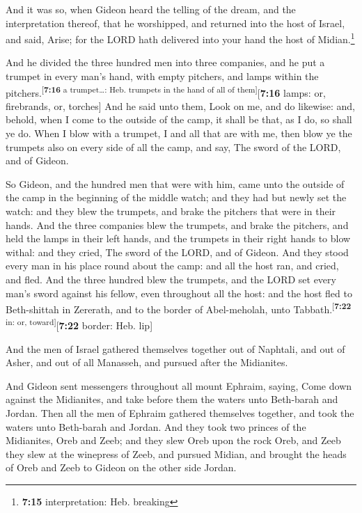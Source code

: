  And it was so, when Gideon heard the telling of the
dream, and the interpretation thereof, that he worshipped, and returned
into the host of Israel, and said, Arise; for the LORD hath delivered
into your hand the host of Midian.\footnote{\textbf{7:15}
  interpretation: Heb. breaking}

 And he divided the three hundred men into three
companies, and he put a trumpet in every man's hand, with empty
pitchers, and lamps within the
pitchers.\textsuperscript{{[}\textbf{7:16} a trumpet\ldots: Heb.
trumpets in the hand of all of them{]}}{[}\textbf{7:16} lamps: or,
firebrands, or, torches{]}  And he said unto them, Look
on me, and do likewise: and, behold, when I come to the outside of the
camp, it shall be that, as I do, so shall ye do.  When I
blow with a trumpet, I and all that are with me, then blow ye the
trumpets also on every side of all the camp, and say, The sword of the
LORD, and of Gideon.

 So Gideon, and the hundred men that were with him, came
unto the outside of the camp in the beginning of the middle watch; and
they had but newly set the watch: and they blew the trumpets, and brake
the pitchers that were in their hands.  And the three
companies blew the trumpets, and brake the pitchers, and held the lamps
in their left hands, and the trumpets in their right hands to blow
withal: and they cried, The sword of the LORD, and of Gideon.
 And they stood every man in his place round about the
camp: and all the host ran, and cried, and fled.  And the
three hundred blew the trumpets, and the LORD set every man's sword
against his fellow, even throughout all the host: and the host fled to
Beth-shittah in Zererath, and to the border of Abel-meholah, unto
Tabbath.\textsuperscript{{[}\textbf{7:22} in: or,
toward{]}}{[}\textbf{7:22} border: Heb. lip{]}

 And the men of Israel gathered themselves together out
of Naphtali, and out of Asher, and out of all Manasseh, and pursued
after the Midianites.

 And Gideon sent messengers throughout all mount Ephraim,
saying, Come down against the Midianites, and take before them the
waters unto Beth-barah and Jordan. Then all the men of Ephraim gathered
themselves together, and took the waters unto Beth-barah and Jordan.
 And they took two princes of the Midianites, Oreb and
Zeeb; and they slew Oreb upon the rock Oreb, and Zeeb they slew at the
winepress of Zeeb, and pursued Midian, and brought the heads of Oreb and
Zeeb to Gideon on the other side Jordan.

